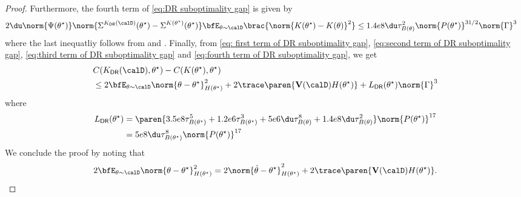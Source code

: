 \begin{proof}
    Furthermore, the fourth term of \eqref{eq:DR suboptimality gap} is given by
    \begin{align}
        &2 \du \norm{\Psi(\theta^\star)} \norm{\Sigma^{K_{\mathsf{DR}}(\calD)}(\theta^\star) - \Sigma^{K(\theta^\star)}(\theta^\star)}\bfE_{\theta\sim\calD}\brac{ \norm{K(\theta^\star) - K(\theta)}^2} \leq 1.4e8 \du \tau^2_{B(\theta)}\norm{P(\theta^\star)}^{31/2}\norm{\Gamma}^3 \label{eq:fourth term of DR suboptimality gap}
    \end{align}
    where the last inequatliy follows from  and . 
    Finally, from \eqref{eq: first term of DR suboptimality gap}, \eqref{eq:second term of DR suboptimality gap}, \eqref{eq:third term of DR suboptimality gap} and \eqref{eq:fourth term of DR suboptimality gap}, we get
    \begin{align*}
         &C(K_{\mathsf{DR}}(\calD), \theta^\star) - C(K(\theta^\star), \theta^\star) \\
         &\leq 2\bfE_{\theta\sim\calD}{\norm{\theta-\theta^\star}^2_{H(\theta^\star)}} + 2\trace\paren{\mathbf{V}(\calD) H(\theta^\star)} + L_{\mathsf{DR}}(\theta^\star)\norm{\Gamma}^3
    \end{align*}
    where
    \begin{align*}
        L_{\mathsf{DR}}(\theta^\star) &= \paren{3.5e8\tau_{B(\theta^\star)}^5 + 1.2e6\tau_{B(\theta^\star)}^3 + 5e6\du\tau^8_{B(\theta)} +  1.4e8\du \tau^2_{B(\theta)}}\norm{P(\theta^\star)}^{17}\\
        &= 5e8\du\tau_{B(\theta^\star)}^8\norm{P(\theta^\star)}^{17}
    \end{align*}
    We conclude the proof by noting that
    \begin{align*}
        2\bfE_{\theta\sim\calD}\norm{\theta-\theta^\star}^2_{H(\theta^\star)} = 
        2\norm{\hat\theta - \theta^\star}_{H(\theta^\star)}^2 + 
        2\trace\paren{\mathbf{V}(\calD) H(\theta^\star)}.
    \end{align*}
\end{proof}

